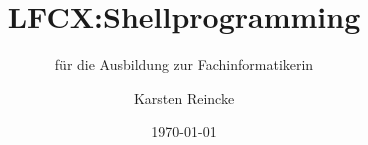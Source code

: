 \documentclass[]{beamer}
\title{LFCX:Shellprogramming}
\subtitle{für die Ausbildung zur Fachinformatikerin}
\institute[GS-LDK]{Gewerbliche Schulen Dillenburg}
\author{Karsten Reincke}
\date{\today}
\def\cfgGl{../../../cfg.gl/}
\begin{document}

\begin{frame}
  \titlepage

  
\end{frame}






\logo{}
\newpage



%
\end{document}
